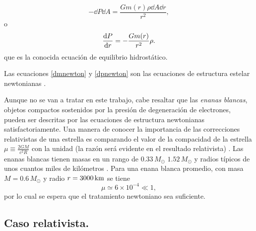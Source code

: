 \begin{equation}
    -\dd{P}\dd{A} =\frac{G m(r)\rho \dd{A} \dd{r}}{r^2},
\end{equation}
o
\begin{equation}
    \dv{P}{r} = - \frac { G m ( r ) } { r ^ { 2 } } \rho.
    \label{dpnewton}
\end{equation}
que es la conocida ecuación de equilibrio hidrostático. 

Las ecuaciones \eqref{dmnewton} y \eqref{dpnewton} son las ecuaciones de estructura estelar newtonianas \cite{Chandrasekhar1958}. 



Aunque no se van a tratar en este trabajo, cabe resaltar que las \emph{enanas blancas}, objetos compactos sostenidos por la presión de degeneración de electrones, pueden ser descritas por las ecuaciones de estructura newtonianas satisfactoriamente. Una manera de conocer la importancia de las correcciones relativistas de una estrella es comparando el valor de la compacidad de la estrella $\mu \equiv \frac{2GM}{c^2R}$ con la unidad (la razón será evidente en el resultado relativista) \cite{Weinberg1972}. Las enanas blancas tienen masas en un rango de $0.33\,M_{\odot}$ $1.52\,M_{\odot}$ y radios típicos de unos cuantos miles de kilómetros \cite{Glendenning2000}. Para una enana blanca promedio, con masa $M=0.6\,M_{\odot}$ y radio $r=3000 \,\rm{km}$ se tiene
\begin{equation}
    \mu \simeq 6\times 10^{-4}\ll 1,
\end{equation}
por lo cual se espera que el tratamiento newtoniano sea suficiente. 

\subsection{Caso relativista.}\label{CR}

